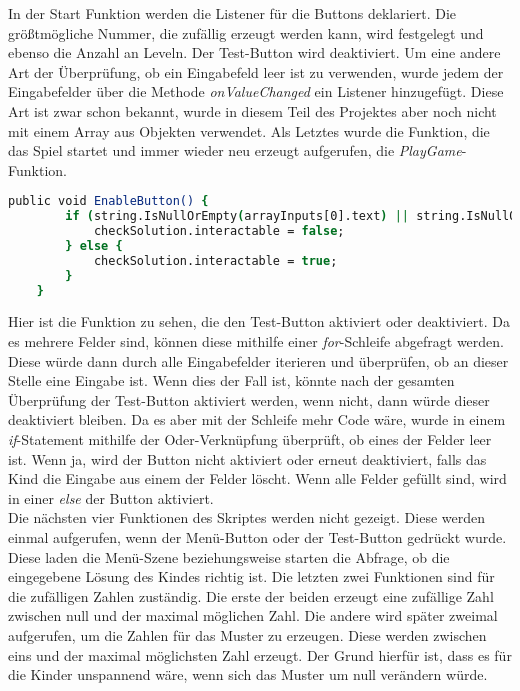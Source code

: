 In der Start Funktion werden die Listener für die Buttons deklariert. Die größtmögliche Nummer, die zufällig erzeugt werden kann, wird festgelegt und ebenso die Anzahl an Leveln.  Der Test-Button wird deaktiviert. Um eine andere Art der Überprüfung, ob ein Eingabefeld leer ist zu verwenden, wurde jedem der Eingabefelder über die Methode \textit{onValueChanged} ein Listener hinzugefügt. Diese Art ist zwar schon bekannt, wurde in diesem Teil des Projektes aber noch nicht mit einem Array aus Objekten verwendet. Als Letztes wurde die Funktion, die das Spiel startet und immer wieder neu erzeugt aufgerufen, die \textit{PlayGame}-Funktion.\\
\begin{lstlisting}[language=csh, caption={hideCircle.cs EnableButton-Funktion}]
	public void EnableButton() {
		if (string.IsNullOrEmpty(arrayInputs[0].text) || string.IsNullOrEmpty(arrayInputs[1].text) || string.IsNullOrEmpty(arrayInputs[2].text) || string.IsNullOrEmpty(arrayInputs[3].text) || string.IsNullOrEmpty(arrayInputs[4].text)) {
			checkSolution.interactable = false;
		} else {
			checkSolution.interactable = true;
		}
	}
\end{lstlisting}
Hier ist die Funktion zu sehen, die den Test-Button aktiviert oder deaktiviert. Da es mehrere Felder sind, können diese mithilfe einer \textit{for}-Schleife abgefragt werden. Diese würde dann durch alle Eingabefelder iterieren und überprüfen, ob an dieser Stelle eine Eingabe ist. Wenn dies der Fall ist, könnte nach der gesamten Überprüfung der Test-Button aktiviert werden, wenn nicht, dann würde dieser deaktiviert bleiben. Da es aber mit der Schleife mehr Code wäre, wurde in einem \textit{if}-Statement mithilfe der Oder-Verknüpfung überprüft, ob eines der Felder leer ist. Wenn ja, wird der Button nicht aktiviert oder erneut deaktiviert, falls das Kind die Eingabe aus einem der Felder löscht. Wenn alle Felder gefüllt sind, wird in einer \textit{else} der Button aktiviert.\\
Die nächsten vier Funktionen des Skriptes werden nicht gezeigt. Diese werden einmal aufgerufen, wenn der Menü-Button oder der Test-Button gedrückt wurde. Diese laden die Menü-Szene beziehungsweise starten die Abfrage, ob die eingegebene Lösung des Kindes richtig ist. Die letzten zwei Funktionen sind für die zufälligen Zahlen zuständig. Die erste der beiden erzeugt eine zufällige Zahl zwischen null und der maximal möglichen Zahl. Die andere wird später zweimal aufgerufen, um die Zahlen für das Muster zu erzeugen. Diese werden zwischen eins und der maximal möglichsten Zahl erzeugt. Der Grund hierfür ist, dass es für die Kinder unspannend wäre, wenn sich das Muster um null verändern würde.\\
